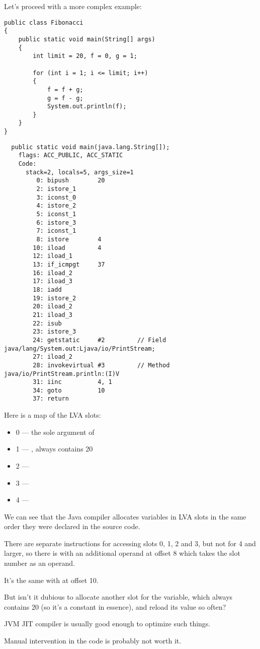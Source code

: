 Let's proceed with a more complex example:


\begin{lstlisting}[style=customjava]
public class Fibonacci
{
	public static void main(String[] args)
	{ 
		int limit = 20, f = 0, g = 1;

		for (int i = 1; i <= limit; i++)
		{
			f = f + g;
			g = f - g;
			System.out.println(f); 
		}
	}
}
\end{lstlisting}

\begin{lstlisting}
  public static void main(java.lang.String[]);
    flags: ACC_PUBLIC, ACC_STATIC
    Code:
      stack=2, locals=5, args_size=1
         0: bipush        20
         2: istore_1      
         3: iconst_0      
         4: istore_2      
         5: iconst_1      
         6: istore_3      
         7: iconst_1      
         8: istore        4
        10: iload         4
        12: iload_1       
        13: if_icmpgt     37
        16: iload_2       
        17: iload_3       
        18: iadd          
        19: istore_2      
        20: iload_2       
        21: iload_3       
        22: isub          
        23: istore_3      
        24: getstatic     #2         // Field java/lang/System.out:Ljava/io/PrintStream;
        27: iload_2       
        28: invokevirtual #3         // Method java/io/PrintStream.println:(I)V
        31: iinc          4, 1
        34: goto          10
        37: return        
\end{lstlisting}
        
Here is a map of the \ac{LVA} slots:


\begin{itemize}
\item 0 --- the sole argument of \main
\item 1 --- , always contains 20
\item 2 --- 
\item 3 --- 
\item 4 --- 
\end{itemize}

We can see that the Java compiler allocates variables in \ac{LVA} slots in the same order 
they were declared in the source code.


There are separate  instructions for accessing slots 0, 1, 2 and 3, 
but not for 4 and larger, so there is  with an additional operand at offset 8 
which takes the slot number as an operand.

It's the same with  at offset 10.


But isn't it dubious to allocate another slot for the  variable, which 
always contains 20 (so it's a constant in essence), and reload its value so often?

\ac{JVM} \ac{JIT} compiler is usually good enough to optimize such things.

Manual intervention in the code is probably not worth it.


